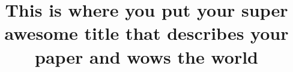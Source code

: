 \documentclass[12pt]{article}
\title{\large This is where you put your super awesome title that describes your paper and wows the world}
\author{}
\date{} %
\begin{document}
\maketitle



\begin{abstract} %

\end{abstract}
\end{document}
